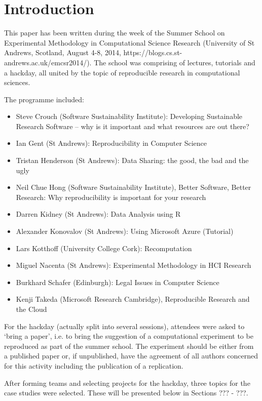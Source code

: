\section{Introduction}
\label{s:intro}

This paper has been written during the week of the Summer School
on Experimental Methodology in Computational Science Research
(University of St Andrews, Scotland, August 4-8, 2014,
https://blogs.cs.st-andrews.ac.uk/emcsr2014/). The 
school was comprising of lectures, tutorials and a hackday,
all united by the topic of reproducible research in computational
sciences. 

The programme included:

\begin{itemize}
   \item Steve Crouch (Software Sustainability Institute): Developing Sustainable Research Software -- why is it important and what resources are out there?
   \item Ian Gent (St Andrews): Reproducibility in Computer Science
   \item Tristan Henderson (St Andrews): Data Sharing: the good, the bad and the ugly
    \item Neil Chue Hong (Software Sustainability Institute), Better Software, Better Research: Why reproducibility is important for your research
    \item Darren Kidney (St Andrews): Data Analysis using R
    \item Alexander Konovalov (St Andrews): Using Microsoft Azure (Tutorial)
    \item Lars Kotthoff (University College Cork): Recomputation
    \item Miguel Nacenta (St Andrews): Experimental Methodology in HCI Research
    \item Burkhard Schafer (Edinburgh): Legal Issues in Computer Science
    \item Kenji Takeda (Microsoft Research Cambridge), Reproducible Research and the Cloud
\end{itemize}

For the hackday (actually split into several sessions), attendees 
were asked to `bring a paper', i.e. to bring the suggestion of a 
computational experiment to be reproduced as part of the summer school. 
The experiment should be either from a published paper or, if unpublished, 
have the agreement of all authors concerned for this activity including 
the publication of a replication. 

After forming teams and selecting projects for the hackday, three
topics for the case studies were selected. These will be presented below
in Sections ??? - ???. 



